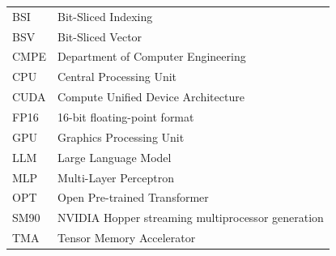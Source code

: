 {
\singlespace
\renewcommand{\arraystretch}{1.2}%
\begin{tabularx}{\linewidth}{ l X }
  BSI & Bit-Sliced Indexing \\
  BSV & Bit-Sliced Vector \\
  CMPE & Department of Computer Engineering \\
  CPU & Central Processing Unit \\
  CUDA & Compute Unified Device Architecture \\
  FP16 & 16-bit floating-point format \\
  GPU & Graphics Processing Unit \\
  LLM & Large Language Model \\
  MLP & Multi-Layer Perceptron \\
  OPT & Open Pre-trained Transformer \\
  SM90 & NVIDIA Hopper streaming multiprocessor generation \\
  TMA & Tensor Memory Accelerator \\
\end{tabularx}
}
